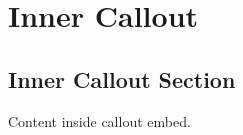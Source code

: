 \section{Inner Callout}\label{inner-callout}

\subsection{Inner Callout Section}\label{inner-callout-section}

Content inside callout embed.
